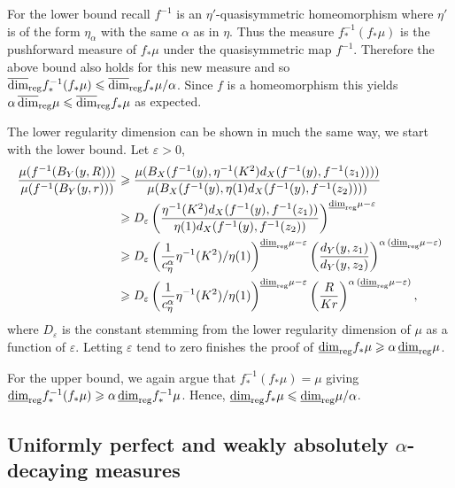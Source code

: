 For the lower bound recall $f^{-1}$ is an $\eta'$-quasisymmetric homeomorphism where $\eta'$ is of the form $\eta_\alpha$ with the same $\alpha$ as in $\eta$. Thus the measure $f^{-1}_* (f_*\mu)$ is the pushforward measure of $f_*\mu$ under the quasisymmetric map $f^{-1}$. Therefore the above bound also holds for this new measure and so $\overline{\dim}_{\textup{reg}} f^{-1}_* (f_*\mu) \leqslant \overline{\dim}_{\textup{reg}} f_* \mu / \alpha$. Since $f$ is a homeomorphism this yields $\alpha\, \overline{\dim}_{\textup{reg}} \mu \leqslant \overline{\dim}_{\textup{reg}} f_* \mu$ as expected. 


The lower regularity dimension can be shown in much the same way, we start with the lower bound. Let $\varepsilon > 0$,
\begin{align*}
\frac{\mu(f^{-1}(B_Y(y,R)))}{\mu(f^{-1}(B_Y(y,r)))} &\geqslant \frac{\mu(B_X(f^{-1}(y),\eta^{-1}(K^2)d_X(f^{-1}(y),f^{-1}(z_1)) ))}{\mu(B_X(f^{-1}(y),\eta(1)d_X(f^{-1}(y), f^{-1}(z_2)) ))} \\
& \geqslant D_{\varepsilon}\left( \frac{\eta^{-1}(K^2)d_X(f^{-1}(y),f^{-1}(z_1))}{\eta(1)d_X(f^{-1}(y),f^{-1}(z_2))}\right)^{\underline{\dim}_{\textup{reg}} \mu - \varepsilon} \\
& \geqslant D_{\varepsilon}\left(\frac{1}{c_\eta^{\alpha}} \eta^{-1}(K^2)/\eta(1)\right)^{\underline{\dim}_{\textup{reg}} \mu - \varepsilon} \left(\frac{d_Y(y,z_1)}{d_Y(y,z_2)} \right)^{\alpha \,(\underline{\dim}_{\textup{reg}} \mu - \varepsilon)} \\
& \geqslant D_{\varepsilon}\left(\frac{1}{c_\eta^{\alpha}} \eta^{-1}(K^2)/\eta(1)\right)^{\underline{\dim}_{\textup{reg}} \mu - \varepsilon} \left(\frac{R}{K r} \right)^{\alpha \,(\underline{\dim}_{\textup{reg}} \mu - \varepsilon)},
\end{align*}
where $D_\varepsilon$ is the constant stemming from the lower regularity dimension of $\mu$ as a function of $\varepsilon$. Letting $\varepsilon$ tend to zero finishes the proof of $\underline{\dim}_{\textup{reg}} f_*\mu \geqslant \alpha \, \underline{\dim}_{\textup{reg}} \mu$.

For the upper bound, we again argue that $f_*^{-1}(f_*\mu) = \mu$ giving $\underline{\dim}_{\textup{reg}} f_*^{-1}(f_* \mu) \geqslant \alpha \, \underline{\dim}_{\textup{reg}} f_*^{-1} \mu$. Hence, $\underline{\dim}_{\textup{reg}} f_* \mu \leqslant \underline{\dim}_{\textup{reg}} \mu / \alpha$.











\subsection{Uniformly perfect and weakly absolutely $\alpha$-decaying measures}\label{ch-quantifying:diophantine-proof}



